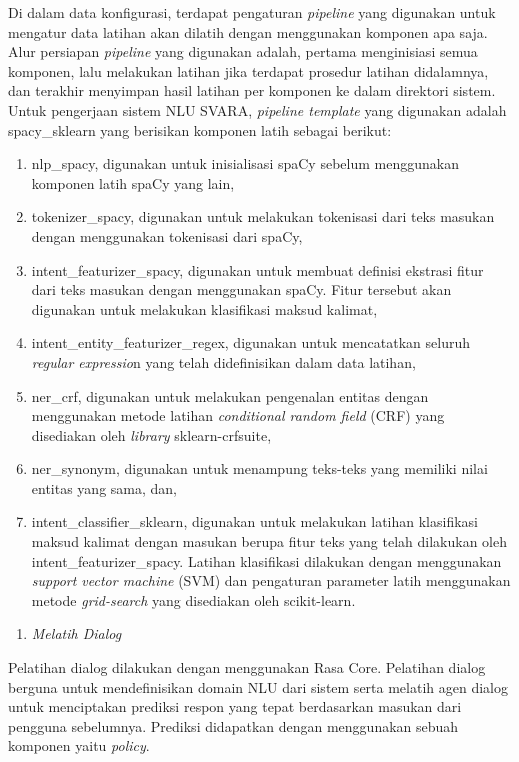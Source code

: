 Di dalam data konfigurasi, terdapat pengaturan \textit{pipeline} yang digunakan untuk mengatur data latihan akan dilatih dengan menggunakan komponen apa saja. Alur persiapan \textit{pipeline} yang digunakan adalah, pertama menginisiasi semua komponen, lalu melakukan latihan jika terdapat prosedur latihan didalamnya, dan terakhir menyimpan hasil latihan per komponen ke dalam direktori sistem. Untuk pengerjaan sistem NLU SVARA, \textit{pipeline template} yang digunakan adalah spacy\_sklearn yang berisikan komponen latih sebagai berikut:

\begin{enumerate}
	\item nlp\_spacy, digunakan untuk inisialisasi spaCy sebelum menggunakan komponen latih spaCy yang lain,
	\item tokenizer\_spacy, digunakan untuk melakukan tokenisasi dari teks masukan dengan menggunakan tokenisasi dari spaCy,
	\item intent\_featurizer\_spacy, digunakan untuk membuat definisi ekstrasi fitur dari teks masukan dengan menggunakan spaCy. Fitur tersebut akan digunakan untuk melakukan klasifikasi maksud kalimat,
	\item intent\_entity\_featurizer\_regex, digunakan untuk mencatatkan seluruh \textit{regular expressio}n yang telah didefinisikan dalam data latihan,
	\item ner\_crf, digunakan untuk melakukan pengenalan entitas dengan menggunakan metode latihan \textit{conditional random field} (CRF) yang disediakan oleh \textit{library} sklearn-crfsuite,
	\item ner\_synonym, digunakan untuk menampung teks-teks yang memiliki nilai entitas yang sama, dan,
	\item intent\_classifier\_sklearn, digunakan untuk melakukan latihan klasifikasi maksud kalimat dengan masukan berupa fitur teks yang telah dilakukan oleh intent\_featurizer\_spacy. Latihan klasifikasi dilakukan dengan menggunakan \textit{support vector machine} (SVM) dan pengaturan parameter latih menggunakan metode \textit{grid-search} yang disediakan oleh scikit-learn.
\end{enumerate}

\begin{enumerate}[resume*=rasa_process_list]
	\item \textit{Melatih Dialog}
\end{enumerate}

Pelatihan dialog dilakukan dengan menggunakan Rasa Core. Pelatihan dialog berguna untuk mendefinisikan domain NLU dari sistem serta melatih agen dialog untuk menciptakan prediksi respon yang tepat berdasarkan masukan dari pengguna sebelumnya. Prediksi didapatkan dengan menggunakan sebuah komponen yaitu \textit{policy}.

